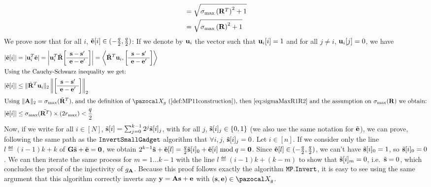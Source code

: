 {\begin{proofE}
\begin{align}
      &= \sqrt{\sigma_{\max}\left(\mathbf{R}^T\right)^2 + 1}\nonumber\\
      &= \sqrt{\sigma_{\max}\left(\mathbf{R}\right)^2 + 1}\label{eq:sigmaMaxR1R2}
    \end{align}
    \endgroup
    We prove now that for all $i$, $\tilde{\mathbf{e}}[i] \in (-\frac{q}{2}, \frac{q}{2})$: If we denote by $\mathbf{u}_i$ the vector such that $\mathbf{u}_i[i] = 1$ and for all $j \neq i$, $\mathbf{u}_i[j] = 0$, we have
    \begin{align}
      |\tilde{\vect{e}}[i]|
      &= |\vect{u}_i^T\tilde{\vect{e}}| = \left|\vect{u}_i^T \tilde{\vect{R}}\SmallBlockMatrix{\vect{s}-\vect{s}'}{\vect{e}-\vect{e}'}\right|
        = \left\langle \tilde{\vect{R}}^T \vect{u}_i, \SmallBlockMatrix{\vect{s}-\vect{s}'}{\vect{e}-\vect{e}'} \right\rangle\\
      \intertext{Using the Cauchy-Schwarz inequality we get:}
      |\tilde{\vect{e}}[i]|&\leq \|\tilde{\vect{R}}^T \vect{u}_i\|_2 \left\|\SmallBlockMatrix{\vect{s}-\vect{s}'}{\vect{e}-\vect{e}'}\right\|_2\\
      \intertext{Using $\|\vect{A}\|_2 = \sigma_{\max}(\tilde{\vect{R}}^T)$, and the definition of $\cX_g$ (\cref{def:MP11construction}), then \cref{eq:sigmaMaxR1R2} and the assumption on $\sigma_{\max}(\vect{R})$ we obtain:}
      |\tilde{\vect{e}}[i]|&\leq \sigma_{\max}(\tilde{\vect{R}^T}) \times (2 r_{\max}) < \frac{q}{2}
    \end{align}
    Now, if we write for all $i \in [N]$, $\tilde{\mathbf{s}}[i] = \sum_{j = 0}^{k-1} 2^j \tilde{\mathbf{s}}[i]_j$, with for all $j$, $\tilde{\mathbf{s}}[i]_j \in \{0,1\}$ (we also use the same notation for $\tilde{\mathbf{e}}$), we can prove, following the same path as the ${\texttt{InvertSmallGadget}}$ algorithm that $\forall i,j$, $\tilde{\mathbf{s}}[i]_j = 0$. Let $i \in [n]$. If we consider only the line $l \eqdef (i-1)k+k$ of $\mathbf{G}\tilde{\mathbf{s}}+\tilde{\mathbf{e}}=\mathbf{0}$, we obtain $2^{k-1}\tilde{\mathbf{s}}+\tilde{\mathbf{e}}[l] = \frac{q}{2} \tilde{\mathbf{s}}[i]_0 + \tilde{\mathbf{e}}[i] \bmod q = \mathbf{0}$. Since $\tilde{\mathbf{e}}[l] \in (-\frac{q}{2}, \frac{q}{2})$, we can't have $\tilde{\mathbf{s}}[i]_0 = 1$, so $\tilde{\mathbf{s}}[i]_0 = 0$. We can then iterate the same process for $m = 1 \dots k-1$ with the line $l \eqdef (i-1)k+(k-m)$ to show that $\tilde{\mathbf{s}}[i]_{m} = 0$, i.e.\ $\tilde{\mathbf{s}}=0$, which concludes the proof of the injectivity of $g_{\mathbf{A}}$. Because this proof follows exactly the algorithm ${\tt MP.Invert}$, it is easy to see using the same argument that this algorithm correctly inverts any $\mathbf{y} = \mathbf{A}\mathbf{s}+\mathbf{e}$ with $(\vect{s},\vect{e}) \in \cX_g$.


\end{proofE}}
